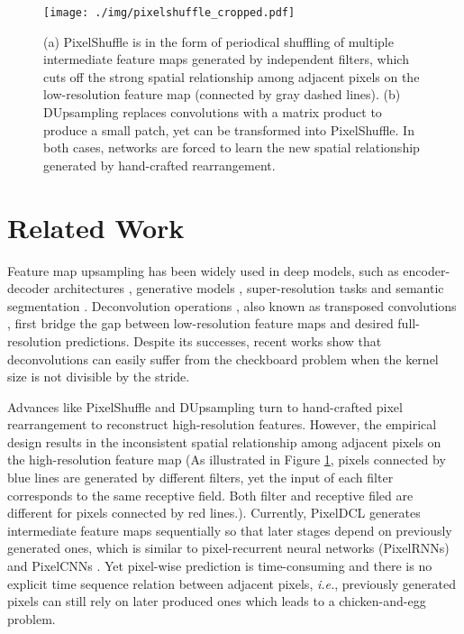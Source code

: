 \documentclass[10pt,twocolumn,letterpaper]{article}
\begin{document}
\begin{figure}[t]
  \centering
  \texttt{[image: ./img/pixelshuffle\_cropped.pdf]}
\caption{(a) PixelShuffle \cite{ShiCHTABRW16} is in the form of periodical shuffling of multiple intermediate feature maps generated by independent filters, which cuts off the strong spatial relationship among adjacent pixels on the low-resolution feature map (connected by gray dashed lines). (b) DUpsampling \cite{DUpsampling} replaces convolutions with a matrix product to produce a small patch, yet can be transformed into PixelShuffle. In both cases, networks are forced to learn the new spatial relationship generated by hand-crafted rearrangement.}
\label{pixelshuffle}
\end{figure}

\section{Related Work}
Feature map upsampling has been widely used in deep models, such as encoder-decoder architectures \cite{NohHH15, RonnebergerFB15}, generative models \cite{RadfordMC15, MakhzaniF15}, super-resolution tasks \cite{DongLT16, ShiCHTABRW16, HeMWLY019} and semantic segmentation \cite{LongSD15, ChenPKMY18}. Deconvolution operations \cite{ZeilerKTF10, ZeilerTF11}, also known as transposed convolutions \cite{VedaldiL15}, first bridge the gap between low-resolution feature maps and desired full-resolution predictions. Despite its successes, recent works \cite{odena2016deconvolution, pixeldeconv} show that deconvolutions can easily suffer from the checkboard problem when the kernel size is not divisible by the stride. 

Advances like PixelShuffle \cite{ShiCHTABRW16} and DUpsampling \cite{DUpsampling} turn to hand-crafted pixel rearrangement to reconstruct high-resolution features. However, the empirical design results in the inconsistent spatial relationship among adjacent pixels on the high-resolution feature map (As illustrated in Figure \ref{pixelshuffle}, pixels connected by blue lines are generated by different filters, yet the input of each filter corresponds to the same receptive field. Both filter and receptive filed are different for pixels connected by red lines.). Currently, PixelDCL \cite{pixeldeconv} generates intermediate feature maps sequentially so that later stages depend on previously generated ones, which is similar to pixel-recurrent neural networks (PixelRNNs) \cite{OordKK16} and PixelCNNs \cite{OordKEKVG16}. Yet pixel-wise prediction is time-consuming and there is no explicit time sequence relation between adjacent pixels, \textit{i.e.}, previously generated pixels can still rely on later produced ones which leads to a chicken-and-egg problem.
\end{document}
